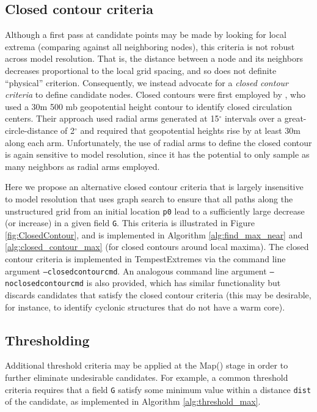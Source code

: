 \documentclass[gmdd, hvmath, online]{copernicus_discussions}
\begin{document}
\subsection{Closed contour criteria} \label{sec:ClosedContour}

Although a first pass at candidate points may be made by looking for local extrema (comparing against all neighboring nodes), this criteria is not robust across model resolution.  That is, the distance between a node and its neighbors decreases proportional to the local grid spacing, and so does not definite ``physical'' criterion.  Consequently, we instead advocate for a \textit{closed contour criteria} to define candidate nodes.  Closed contours were first employed by \cite{bell198915}, who used a 30m 500 mb geopotential height contour to identify closed circulation centers.  Their approach used radial arms generated at 15$^\circ$ intervals over a great-circle-distance of 2$^\circ$ and required that geopotential heights rise by at least 30m along each arm.  Unfortunately, the use of radial arms to define the closed contour is again sensitive to model resolution, since it has the potential to only sample as many neighbors as radial arms employed.

Here we propose an alternative closed contour criteria that is largely insensitive to model resolution that uses graph search to ensure that all paths along the unstructured grid from an initial location \texttt{p0} lead to a sufficiently large decrease (or increase) in a given field \texttt{G}.  This criteria is illustrated in Figure \ref{fig:ClosedContour}, and is implemented in Algorithm \ref{alg:find_max_near} and \ref{alg:closed_contour_max} (for closed contours around local maxima).  The closed contour criteria is implemented in TempestExtremes via the command line argument \texttt{--closedcontourcmd}.  An analogous command line argument \texttt{--noclosedcontourcmd} is also provided, which has similar functionality but discards candidates that satisfy the closed contour criteria (this may be desirable, for instance, to identify cyclonic structures that do not have a warm core).

\subsection{Thresholding}

Additional threshold criteria may be applied at the Map() stage in order to further eliminate undesirable candidates.  For example, a common threshold criteria requires that a field \texttt{G} satisfy some minimum value within a distance \texttt{dist} of the candidate, as implemented in Algorithm \ref{alg:threshold_max}.
\end{document}
